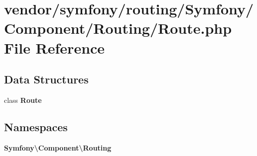 \section{vendor/symfony/routing/\+Symfony/\+Component/\+Routing/\+Route.php File Reference}
\label{symfony_2routing_2_symfony_2_component_2_routing_2_route_8php}
\subsection*{Data Structures}
\begin{DoxyCompactItemize}
\item 
class {\bf Route}
\end{DoxyCompactItemize}
\subsection*{Namespaces}
\begin{DoxyCompactItemize}
\item 
 {\bf Symfony\textbackslash{}\+Component\textbackslash{}\+Routing}
\end{DoxyCompactItemize}
